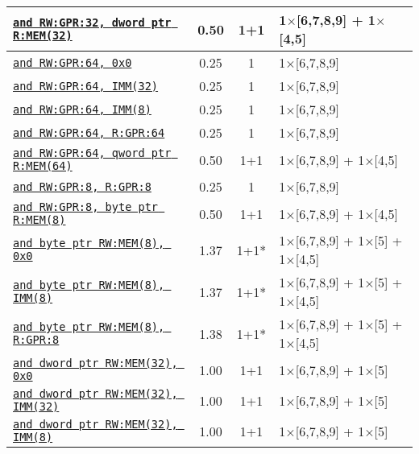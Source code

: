 \documentclass[a4paper,english,fontsize=9]{scrartcl}
\begin{document}
\begin{longtable}{p{}ccL{.25\textwidth}}
  \midrule
  \texttt{\href{https://felixcloutier.com/x86/AND.html}{and RW:GPR:32, dword ptr R:MEM(32)}} & 0.50 & 1+1 & 1\(\times\)[6,7,8,9] + 1\(\times\)[4,5] \\
  \midrule
  \texttt{\href{https://felixcloutier.com/x86/AND.html}{and RW:GPR:64, 0x0}} & 0.25 & 1 & 1\(\times\)[6,7,8,9] \\
  \midrule
  \texttt{\href{https://felixcloutier.com/x86/AND.html}{and RW:GPR:64, IMM(32)}} & 0.25 & 1 & 1\(\times\)[6,7,8,9] \\
  \midrule
  \texttt{\href{https://felixcloutier.com/x86/AND.html}{and RW:GPR:64, IMM(8)}} & 0.25 & 1 & 1\(\times\)[6,7,8,9] \\
  \midrule
  \texttt{\href{https://felixcloutier.com/x86/AND.html}{and RW:GPR:64, R:GPR:64}} & 0.25 & 1 & 1\(\times\)[6,7,8,9] \\
  \midrule
  \texttt{\href{https://felixcloutier.com/x86/AND.html}{and RW:GPR:64, qword ptr R:MEM(64)}} & 0.50 & 1+1 & 1\(\times\)[6,7,8,9] + 1\(\times\)[4,5] \\
  \midrule
  \texttt{\href{https://felixcloutier.com/x86/AND.html}{and RW:GPR:8, R:GPR:8}} & 0.25 & 1 & 1\(\times\)[6,7,8,9] \\
  \midrule
  \texttt{\href{https://felixcloutier.com/x86/AND.html}{and RW:GPR:8, byte ptr R:MEM(8)}} & 0.50 & 1+1 & 1\(\times\)[6,7,8,9] + 1\(\times\)[4,5] \\
  \midrule
  \texttt{\href{https://felixcloutier.com/x86/AND.html}{and byte ptr RW:MEM(8), 0x0}} & 1.37 & 1+1* & 1\(\times\)[6,7,8,9] + 1\(\times\)[5] + 1\(\times\)[4,5] \\
  \midrule
  \texttt{\href{https://felixcloutier.com/x86/AND.html}{and byte ptr RW:MEM(8), IMM(8)}} & 1.37 & 1+1* & 1\(\times\)[6,7,8,9] + 1\(\times\)[5] + 1\(\times\)[4,5] \\
  \midrule
  \texttt{\href{https://felixcloutier.com/x86/AND.html}{and byte ptr RW:MEM(8), R:GPR:8}} & 1.38 & 1+1* & 1\(\times\)[6,7,8,9] + 1\(\times\)[5] + 1\(\times\)[4,5] \\
  \midrule
  \texttt{\href{https://felixcloutier.com/x86/AND.html}{and dword ptr RW:MEM(32), 0x0}} & 1.00 & 1+1 & 1\(\times\)[6,7,8,9] + 1\(\times\)[5] \\
  \midrule
  \texttt{\href{https://felixcloutier.com/x86/AND.html}{and dword ptr RW:MEM(32), IMM(32)}} & 1.00 & 1+1 & 1\(\times\)[6,7,8,9] + 1\(\times\)[5] \\
  \midrule
  \texttt{\href{https://felixcloutier.com/x86/AND.html}{and dword ptr RW:MEM(32), IMM(8)}} & 1.00 & 1+1 & 1\(\times\)[6,7,8,9] + 1\(\times\)[5] \\

\end{longtable}
\end{document}
